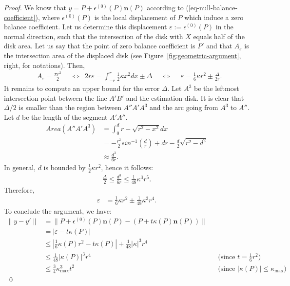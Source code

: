 \documentclass[smallextended]{svjour3}
\newcommand{\Equ}[1]{(\ref{#1})}
\begin{document}
\begin{proof}
  We know that $y = P + \epsilon^{(0)}(P)\mathbf{n}(P)$ according
  to \Equ{eq-null-balance-coefficient}, where $\epsilon^{(0)}(P)$ is
  the local displacement of $P$ which induce a zero balance
  coefficient. Let us determine this displacement $\varepsilon :=
  \epsilon^{(0)}(P)$ in the normal direction, such that the
  intersection of the disk with $X$ equals half of the disk area. Let
  us say that the point of zero balance coefficient is $P'$ and that
  $A_{\varepsilon}$ is the intersection area of the displaced
  disk (see Figure~\ref{fig:geometric-argument}, right, for notations). Then,
%
%
\begin{align*}
	 & A_{\varepsilon} = \frac{\pi r ^2}{2} 
	 && \Leftrightarrow & 2r\varepsilon = \int_{-r}^{r}{\frac{1}{2}\kappa x^2dx} \pm \Delta 
	&& \Leftrightarrow & & \varepsilon = \frac{1}{6}\kappa r^2 \pm \frac{\Delta}{2r}.
\end{align*}
%
%
It remains to compute an upper bound for the error $\Delta$. Let $A^3$ be the leftmost intersection point between the line $A'B'$ and the estimation disk. It is clear that $\Delta/2$ is smaller than the region between $A''A'A^3$ and the arc going from $A^3$ to $A''$. Let $d$ be the length of the segment $A'A''$. 
%
%
\begin{align*}
	Area(A''A'A^3) &= \int_0^d{r - \sqrt{r^2 - x^2} dx} \\
				   &= -\frac{r^2}{2}sin^{-1}\left(\frac{d}{r}\right) + dr - \frac{d}{2}\sqrt{r^2-d^2} \\
				   &\approx \frac{d^3}{6r}.
\end{align*}
%
%
In general, $d$ is bounded by $\frac{1}{2}\kappa r^2$, hence it follows:
%
%
\begin{align*}
	\frac{\Delta}{2} \leq \frac{d^3}{6r} \leq \frac{1}{48}\kappa^3r^5.
\end{align*}
%
%
Therefore,
%
%
\begin{align*}
	\varepsilon &= \frac{1}{6}\kappa r^2 \pm \frac{1}{48}\kappa^3r^4.
\end{align*}
%
%
To conclude the argument, we have:
\begin{align*}
  \| y - y' \| & = \| P + \epsilon^{(0)}(P)\mathbf{n}(P) - (P+t\kappa(P)\mathbf{n}(P)) \| \\
  & = | \varepsilon - t \kappa(P) | \\
  & \le \left| \frac{1}{6}\kappa(P) r^2 - t\kappa(P) \right| + \frac{1}{48}|\kappa|^3r^4\\
  & \le \frac{1}{48}|\kappa(P)|^3r^4 && \text{(since $t=\frac{1}{6}r^2$)} \\
  & \le \frac{3}{4}\kappa_{\max}^3 t^2 && \text{(since $|\kappa(P)| \le \kappa_{\max}$)}
\end{align*}
\mbox{~}\hfill\qed
\end{proof}
\end{document}
